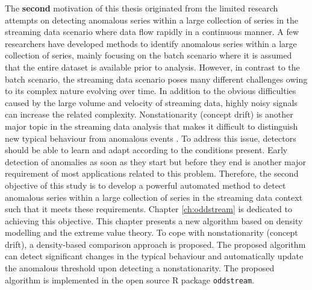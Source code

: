 \documentclass{monashthesis}
\theoremstyle{definition}
\theoremstyle{definition}
\theoremstyle{definition}
\theoremstyle{remark}
\begin{document}
The \textbf{second} motivation of this thesis originated from the limited research attempts on detecting anomalous series within a large collection of series in the streaming data scenario where data flow rapidly in a continuous manner. A few researchers \autocite{hyndman2015large,wilkinsonvisualizing} have developed methods to identify anomalous series within a large collection of series, mainly focusing on the batch scenario where it is assumed that the entire dataset is available prior to analysis. However, in contrast to the batch scenario, the streaming data scenario poses many different challenges owing to its complex nature evolving over time. In addition to the obvious difficulties caused by the large volume and velocity of streaming data, highly noisy signals can increase the related complexity. Nonstationarity (concept drift) is another major topic in the streaming data analysis that makes it difficult to distinguish new typical behaviour from anomalous events \autocite{faria2016novelty}. To address this issue, detectors should be able to learn and adapt according to the conditions present. Early detection of anomalies as soon as they start but before they end is another major requirement of most applications related to this problem. Therefore, the second objective of this study is to develop a powerful automated method to detect anomalous series within a large collection of series in the streaming data context such that it meets these requirements. Chapter \ref{ch:oddstream} is dedicated to achieving this objective. This chapter presents a new algorithm based on density modelling and the extreme value theory. To cope with nonstationarity (concept drift), a density-based comparison approach is proposed. The proposed algorithm can detect significant changes in the typical behaviour and automatically update the anomalous threshold upon detecting a nonstationarity. The proposed algorithm is implemented in the open source R package \texttt{oddstream}.
\end{document}
